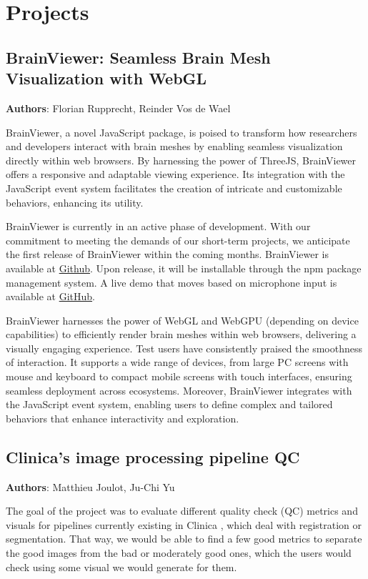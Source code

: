\documentclass{article}
\begin{document}
\section{Projects}



\subsection{BrainViewer: Seamless Brain Mesh Visualization with WebGL}
\textbf{Authors}: Florian Rupprecht, Reinder Vos de Wael

BrainViewer, a novel JavaScript package, is poised to transform how researchers and developers interact with brain meshes by enabling seamless visualization directly within web browsers. By harnessing the power of ThreeJS, BrainViewer offers a responsive and adaptable viewing experience. Its integration with the JavaScript event system facilitates the creation of intricate and customizable behaviors, enhancing its utility.

BrainViewer is currently in an active phase of development. With our commitment to meeting the demands of our short-term projects, we anticipate the first release of BrainViewer within the coming months. BrainViewer is available at \href{https://github.com/cmi-dair/brainviewer}{Github}. Upon release, it will be installable through the npm package management system. A live demo that moves based on microphone input is available at \href{ https://cmi-dair.github.io/brainviewer-demo/}{GitHub}.

BrainViewer harnesses the power of WebGL and WebGPU (depending on device capabilities) to efficiently render brain meshes within web browsers, delivering a visually engaging experience. Test users have consistently praised the smoothness of interaction. It supports a wide range of devices, from large PC screens with mouse and keyboard to compact mobile screens with touch interfaces, ensuring seamless deployment across ecosystems. Moreover, BrainViewer integrates with the JavaScript event system, enabling users to define complex and tailored behaviors that enhance interactivity and exploration.



\subsection{Clinica's image processing pipeline QC}
\textbf{Authors}: Matthieu Joulot, Ju-Chi Yu

The goal of the project was to evaluate different quality check (QC) metrics and visuals for pipelines currently existing in Clinica \cite{routier2021clinica}, which deal with registration or segmentation. That way, we would be able to find a few good metrics to separate the good images from the bad or moderately good ones, which the users would check using some visual we would generate for them.
\end{document}
